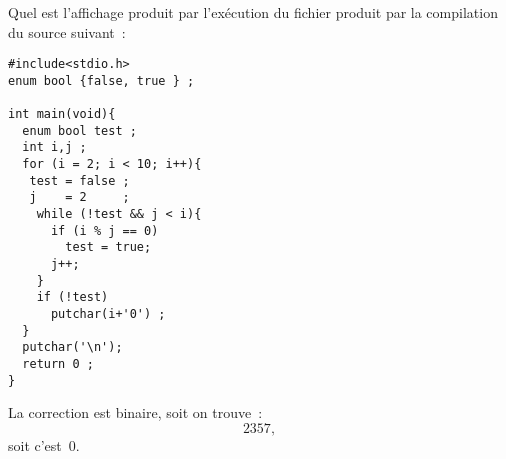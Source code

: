 Quel est l'affichage produit par l'ex\'ecution du fichier produit par
la compilation du source suivant~:
\begin{verbatim}
#include<stdio.h>
enum bool {false, true } ;

int main(void){
  enum bool test ;
  int i,j ;
  for (i = 2; i < 10; i++){
   test = false ;
   j    = 2     ;
    while (!test && j < i){
      if (i % j == 0)
        test = true;
      j++;
    }
    if (!test)
      putchar(i+'0') ;
  }
  putchar('\n');
  return 0 ;
}
\end{verbatim}
\ifcorrection
\begin{correction}
La correction est binaire, soit on trouve~:
\[
2357,
\]
soit c'est~$0$.
\end{correction}
\fi